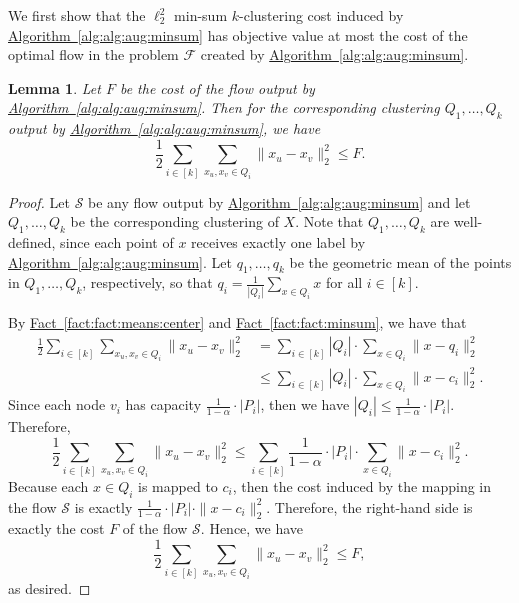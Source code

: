 \documentclass[10pt,a4paper]{amsart}
\newtheorem{lemma}[theorem]{Lemma}
\newcommand{\namedref}[2]{\hyperref[#2]{#1~\ref*{#2}}}
\newcommand{\lemlab}[1]{\label{lem:#1}}
\newcommand{\factref}[1]{\namedref{Fact}{fact:#1}}
\renewcommand{\algref}[1]{\namedref{Algorithm}{alg:#1}}
\def \calF    {\mdef{\mathcal{F}}}
\def \calS    {\mdef{\mathcal{S}}}
\newcommand{\mdef}[1]{{\ensuremath{#1}}\xspace}  %
\begin{document}
We first show that the $\ell_2^2$ min-sum $k$-clustering cost induced by \algref{alg:aug:minsum} has objective value at most the cost of the optimal flow in the problem $\calF$ created by \algref{alg:aug:minsum}.  
\begin{lemma}
\lemlab{lem:flow:to:cost:one}
Let $F$ be the cost of the flow output by \algref{alg:aug:minsum}. 
Then for the corresponding clustering $Q_1,\ldots,Q_k$ output by \algref{alg:aug:minsum}, we have
\[\frac{1}{2}\sum_{i\in[k]}\sum_{x_u,x_v\in Q_i}\|x_u-x_v\|_2^2\le F.\]
\end{lemma}
\begin{proof}
Let $\calS$ be any flow output by \algref{alg:aug:minsum} and let $Q_1,\ldots,Q_k$ be the corresponding clustering of $X$. 
Note that $Q_1,\ldots,Q_k$ are well-defined, since each point of $x$ receives exactly one label by \algref{alg:aug:minsum}. 
Let $q_1,\ldots,q_k$ be the geometric mean of the points in $Q_1,\ldots,Q_k$, respectively, so that $q_i=\frac{1}{|Q_i|}\sum_{x \in Q_i}x$ for all $i\in[k]$. 

By \factref{fact:means:center} and \factref{fact:minsum}, we have that
\begin{align*}
\frac{1}{2}\sum_{i\in[k]}\sum_{x_u,x_v\in Q_i}\|x_u-x_v\|_2^2&=\sum_{i\in[k]}|Q_i|\cdot\sum_{x\in Q_i}\|x-q_i\|_2^2\\
&\le\sum_{i\in[k]}|Q_i|\cdot\sum_{x\in Q_i}\|x-c_i\|_2^2.
\end{align*}
Since each node $v_i$ has capacity $\frac{1}{1-\alpha}\cdot|P_i|$, then we have $|Q_i|\le\frac{1}{1-\alpha}\cdot|P_i|$. 
Therefore,
\[\frac{1}{2}\sum_{i\in[k]}\sum_{x_u,x_v\in Q_i}\|x_u-x_v\|_2^2\le\sum_{i\in[k]}\frac{1}{1-\alpha}\cdot|P_i|\cdot\sum_{x\in Q_i}\|x-c_i\|_2^2.\]
Because each $x\in Q_i$ is mapped to $c_i$, then the cost induced by the mapping in the flow $\calS$ is exactly $\frac{1}{1-\alpha}\cdot|P_i|\cdot\|x-c_i\|_2^2$. 
Therefore, the right-hand side is exactly the cost $F$ of the flow $\calS$. 
Hence, we have
\[\frac{1}{2}\sum_{i\in[k]}\sum_{x_u,x_v\in Q_i}\|x_u-x_v\|_2^2\le F,\]
as desired.
\end{proof}
\end{document}
